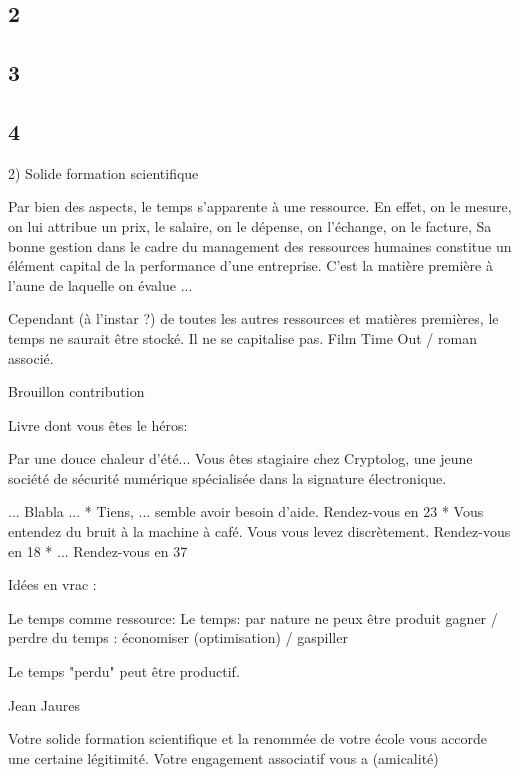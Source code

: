 \documentclass[12pt,a4paper,titlepage]{article}
\begin{document}
\label{n2}
\subsection*{2}


\label{n3}
\subsection*{3}


\label{n4}
\subsection*{4}



2) Solide formation scientifique


Par bien des aspects, le temps s'apparente à une ressource.
En effet, on le mesure, on lui attribue un prix, le salaire, on le dépense, on l'échange, on le facture,
Sa bonne gestion dans le cadre du management des ressources humaines constitue un élément capital de la
performance d'une entreprise. C'est la matière première à l'aune de laquelle on évalue ...

Cependant (à l'instar ?) de toutes les autres ressources et matières premières, le temps ne saurait être stocké.
Il ne se capitalise pas.
Film Time Out / roman associé.







Brouillon contribution

Livre dont vous êtes le héros:

Par une douce chaleur d'été...
Vous êtes stagiaire chez Cryptolog, une jeune société de sécurité numérique spécialisée dans la signature électronique.



... Blabla ...
* Tiens, ... semble avoir besoin d'aide. Rendez-vous en 23
* Vous entendez du bruit à la machine à café. Vous vous levez discrètement. Rendez-vous en 18
* ... Rendez-vous en 37


Idées en vrac :

Le temps comme ressource:
Le temps: par nature ne peux être produit
gagner / perdre du temps : économiser (optimisation) / gaspiller

Le temps "perdu" peut être productif.

Jean Jaures

Votre solide formation scientifique et la renommée de votre école vous accorde une certaine légitimité. Votre engagement associatif vous a  (amicalité)
\end{document}
